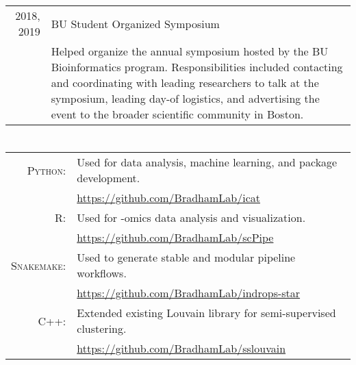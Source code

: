 \documentclass[a4paper,10pt]{report}
\begin{document}
\begin{longtable}{rp{10cm}}
	2018, 2019
	 & BU Student Organized Symposium                                                                                                                           \\
	 & \footnotesize{Helped organize the annual symposium hosted by the BU
		Bioinformatics program. Responsibilities included contacting and
		coordinating with leading researchers to talk at the symposium,
		leading day-of logistics, and advertising the event to the broader
	scientific community in Boston.}                                                                                                                            \\
\end{longtable}

\section{\color{linkcolour}{Programming Languages}}
\begin{tabular}{rl}
	\textsc{Python:}    & Used for data analysis, machine learning, and package development.                                    \\
	                    & \small{\href{https://github.com/BradhamLab/icat}{https://github.com/BradhamLab/icat}}                 \\
	\textsc{R:}         & Used for -omics data analysis and visualization.                                                      \\
	                    & \small{\href{https://github.com/BradhamLab/scPipe}{https://github.com/BradhamLab/scPipe}}             \\
	\textsc{Snakemake:} & Used to generate stable and modular pipeline workflows.                                               \\
	                    & \small{\href{https://github.com/BradhamLab/indrops-star}{https://github.com/BradhamLab/indrops-star}} \\
	\textsc{C++:}       & Extended existing Louvain library for semi-supervised clustering.                                     \\
	                    & \small{\href{https://github.com/BradhamLab/sslouvain}{https://github.com/BradhamLab/sslouvain}}       \\
\end{tabular}
\end{document}
